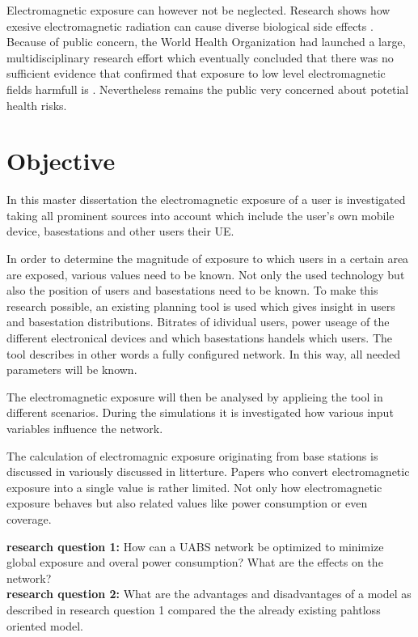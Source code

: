 Electromagnetic exposure can however not be neglected. Research shows how exesive electromagnetic radiation can cause diverse biological side effects \cite{bioeffects}.
Because of public concern, the World Health Organization had launched a large, multidisciplinary research effort which eventually concluded that there was no sufficient evidence that confirmed 
that exposure to low level electromagnetic fields harmfull is \cite{WHO}. Nevertheless remains the public very concerned about potetial health risks.

\section{Objective}
\label{sec:objective}

In this master dissertation the electromagnetic exposure of  a user is investigated taking all prominent sources into account which include the user's own mobile device, basestations
and other users their \gls{UE}.

In order to determine the magnitude of exposure to which users in a certain area are exposed, various values need to be known. 
Not only the used technology but also the position of users and basestations need to be known. 
To make this research possible, an existing planning tool is used which gives insight in users and basestation distributions. Bitrates of idividual users, power useage of 
the different electronical devices and which basestations handels which users. The tool describes in other words a fully configured network.
In this way, all needed parameters will be known.

The electromagnetic exposure will then be analysed by applieing the tool in different scenarios. During the simulations
it is investigated how various input variables influence the network.

The calculation of electromagnic exposure originating from base stations is discussed in variously discussed in litterture. Papers who convert electromagnetic exposure
 into a single value is rather limited.
Not only how electromagnetic exposure behaves but also related values like power consumption or even coverage.



\textbf{research question 1:} How can a \gls{UABS} network be optimized to minimize global exposure and overal power consumption? What are the effects on the network?\\

\textbf{research question 2:} What are the advantages and disadvantages of a model as described in research question 1 compared the the already existing pahtloss oriented model.\\

